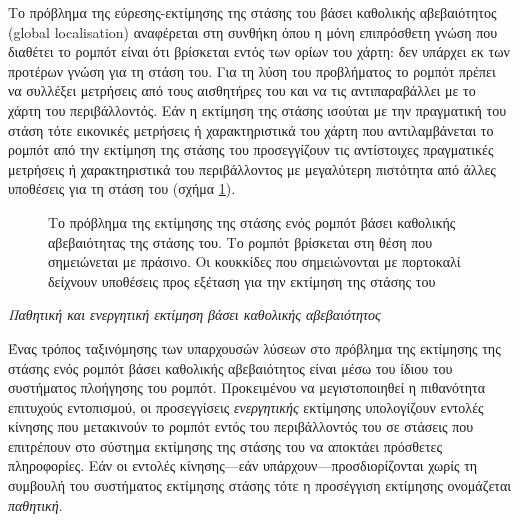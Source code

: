 Το πρόβλημα της εύρεσης-εκτίμησης της στάσης του βάσει καθολικής αβεβαιότητος
(global localisation) αναφέρεται στη συνθήκη όπου η μόνη επιπρόσθετη γνώση που
διαθέτει το ρομπότ είναι ότι βρίσκεται εντός των ορίων του χάρτη: δεν υπάρχει
εκ των προτέρων γνώση για τη στάση του. Για τη λύση του προβλήματος το ρομπότ
πρέπει να συλλέξει μετρήσεις από τους αισθητήρες του και να τις αντιπαραβάλλει
με το χάρτη του περιβάλλοντός. Εάν η εκτίμηση της στάσης ισούται με την
πραγματική του στάση τότε εικονικές μετρήσεις ή χαρακτηριστικά του χάρτη που
αντιλαμβάνεται το ρομπότ από την εκτίμηση της στάσης του προσεγγίζουν τις
αντίστοιχες πραγματικές μετρήσεις ή χαρακτηριστικά του περιβάλλοντος με
μεγαλύτερη πιστότητα από άλλες υποθέσεις για τη στάση του (σχήμα
\ref{fig:global_localisation}).

\begin{figure}[htbp]\centering
  
  \caption{\small Το πρόβλημα της εκτίμησης της στάσης ενός ρομπότ βάσει καθολικής
           αβεβαιότητας της στάσης του. Το ρομπότ βρίσκεται στη θέση που
           σημειώνεται με πράσινο. Οι κουκκίδες που σημειώνονται με πορτοκαλί
           δείχνουν υποθέσεις προς εξέταση για την εκτίμηση της στάσης του}
  \label{fig:global_localisation}
\end{figure}


\begin{bw_box}
\begin{definition}
  \label{definition:01_01_02_02:01}
  \textit{Παθητική και ενεργητική εκτίμηση βάσει καθολικής αβεβαιότητος}

  Ένας τρόπος ταξινόμησης των υπαρχουσών λύσεων στο πρόβλημα
  της εκτίμησης της στάσης ενός ρομπότ βάσει καθολικής αβεβαιότητος είναι μέσω
  του ίδιου του συστήματος πλοήγησης του ρομπότ. Προκειμένου να μεγιστοποιηθεί
  η πιθανότητα επιτυχούς εντοπισμού, οι προσεγγίσεις \textit{ενεργητικής}
  εκτίμησης υπολογίζουν εντολές κίνησης που μετακινούν το ρομπότ εντός του
  περιβάλλοντός του σε στάσεις που επιτρέπουν στο σύστημα εκτίμησης της στάσης
  του να αποκτάει πρόσθετες πληροφορίες. Εάν οι εντολές κίνησης---εάν
  υπάρχουν---προσδιορίζονται χωρίς τη συμβουλή του συστήματος εκτίμησης στάσης
  τότε η προσέγγιση εκτίμησης ονομάζεται \textit{παθητική}.
\end{definition}
\end{bw_box}

